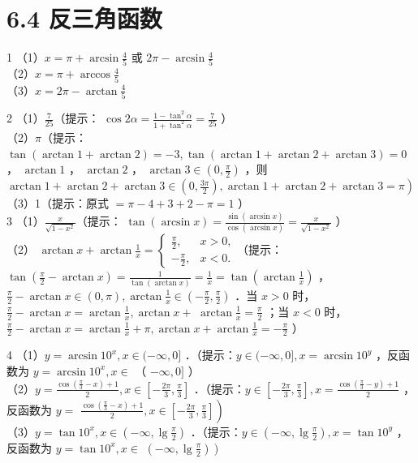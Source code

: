 \documentclass[10pt]{article}
\begin{document}
\section*{6.4 反三角函数}
1 （1）\(x=\pi+\arcsin \frac{4}{5}\) 或 \(2 \pi-\arcsin \frac{4}{5}\)\\
（2）\(x=\pi+\arccos \frac{4}{5}\)\\
（3）\(x=2 \pi-\arctan \frac{4}{5}\)

2 （1）\(\frac{7}{25}\)（提示： \(\cos 2 \alpha=\frac{1-\tan ^{2} \alpha}{1+\tan ^{2} \alpha}=\frac{7}{25}\) ）\\
（2）\(\pi\)（提示： \(\tan (\arctan 1+\arctan 2)=-3, \tan (\arctan 1+\arctan 2+\arctan 3)=0\) ， \(\arctan 1\) ， \(\arctan 2\) ， \(\arctan 3 \in\left(0, \frac{\pi}{2}\right)\) ，则 \(\left.\arctan 1+\arctan 2+\arctan 3 \in\left(0, \frac{3 \pi}{2}\right), \arctan 1+\arctan 2+\arctan 3=\pi\right)\)\\
（3）1（提示：原式 \(=\pi-4+3+2-\pi=1\) ）\\
3 （1）\(\frac{x}{\sqrt{1-x^{2}}}\)（提示： \(\tan (\arcsin x)=\frac{\sin (\arcsin x)}{\cos (\arcsin x)}=\frac{x}{\sqrt{1-x^{2}}}\) ）\\
（2） \(\arctan x+\arctan \frac{1}{x}=\left\{\begin{array}{ll}\frac{\pi}{2}, & x>0, \\ -\frac{\pi}{2}, & x<0 .\end{array}\right.\)（提示： \(\tan \left(\frac{\pi}{2}-\arctan x\right)=\frac{1}{\tan (\arctan x)}=\frac{1}{x}=\tan \left(\arctan \frac{1}{x}\right)\) ， \(\frac{\pi}{2}-\arctan x \in(0, \pi), \arctan \frac{1}{x} \in\left(-\frac{\pi}{2}, \frac{\pi}{2}\right)\) ．当 \(x>0\) 时，\(\frac{\pi}{2}-\arctan x=\arctan \frac{1}{x}, \arctan x+\) \(\arctan \frac{1}{x}=\frac{\pi}{2}\) ；当 \(x<0\) 时，\(\frac{\pi}{2}-\arctan x=\arctan \frac{1}{x}+\pi, \arctan x+\arctan \frac{1}{x}=-\frac{\pi}{2}\) ）

4 （1）\(y=\arcsin 10^{x}, x \in(-\infty, 0]\) ．（提示：\(y \in(-\infty, 0], x=\arcsin 10^{y}\) ，反函数为 \(y=\arcsin 10^{x}, x \in\) （ \(-\infty, 0]\) ）\\
（2）\(y=\frac{\cos \left(\frac{\pi}{3}-x\right)+1}{2}, x \in\left[-\frac{2 \pi}{3}, \frac{\pi}{3}\right]\) ．（提示：\(y \in\left[-\frac{2 \pi}{3}, \frac{\pi}{3}\right], x=\frac{\cos \left(\frac{\pi}{3}-y\right)+1}{2}\) ，反函数为 \(y=\) \(\left.\frac{\cos \left(\frac{\pi}{3}-x\right)+1}{2}, x \in\left[-\frac{2 \pi}{3}, \frac{\pi}{3}\right]\right)\)\\
（3）\(y=\tan 10^{x}, x \in\left(-\infty, \lg \frac{\pi}{2}\right)\) ．（提示：\(y \in\left(-\infty, \lg \frac{\pi}{2}\right), x=\tan 10^{y}\) ，反函数为 \(y=\tan 10^{x}, x \in\) \(\left.\left(-\infty, \lg \frac{\pi}{2}\right)\right)\)
\end{document}
